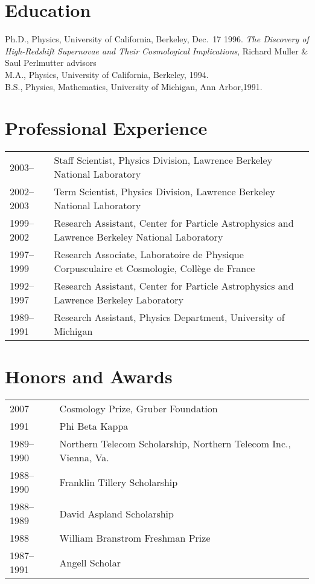 \documentclass[line, margin]{res}
\begin{document}
\address{Lawrence Berkeley National Laboratory\\
1 Cyclotron Rd, MS: 50R6048\\
Berkeley, CA 94720-8164\\
agkim@lbl.gov
}
\begin{resume}

\section{Education}
Ph.D., Physics, University of California, Berkeley, Dec.\ 17 1996. {\it The Discovery of High-Redshift Supernovae and Their Cosmological Implications},
Richard Muller \& Saul Perlmutter advisors\\
M.A., Physics, University of California, Berkeley, 1994.\\
B.S., Physics, Mathematics, University of Michigan, Ann Arbor,1991.

\section{Professional Experience}
\begin{tabular}{lp{4.4in}}
2003-- & Staff Scientist, Physics Division,
Lawrence Berkeley National Laboratory\\
2002--2003 & Term Scientist, Physics Division,
Lawrence Berkeley National Laboratory\\
1999--2002 & Research Assistant, Center for Particle Astrophysics and Lawrence Berkeley National Laboratory\\
1997--1999& Research Associate, Laboratoire de Physique Corpusculaire et Cosmologie,
Coll{\`e}ge de France\\
1992--1997 & Research Assistant, Center for Particle Astrophysics and Lawrence Berkeley Laboratory\\
1989--1991 & Research Assistant, Physics Department, University of Michigan\\
\end{tabular}

\section{Honors and Awards}
\begin{tabular}{ll}
2007 & Cosmology Prize, Gruber Foundation\\
1991 & Phi Beta Kappa\\
1989--1990 & Northern Telecom Scholarship, Northern Telecom Inc., Vienna, Va.\\
1988--1990 & Franklin Tillery Scholarship\\
1988--1989 &  David Aspland Scholarship\\
1988 & William Branstrom Freshman Prize\\
1987--1991 & Angell Scholar\\
\end{tabular}


\end{resume}
\end{document}
